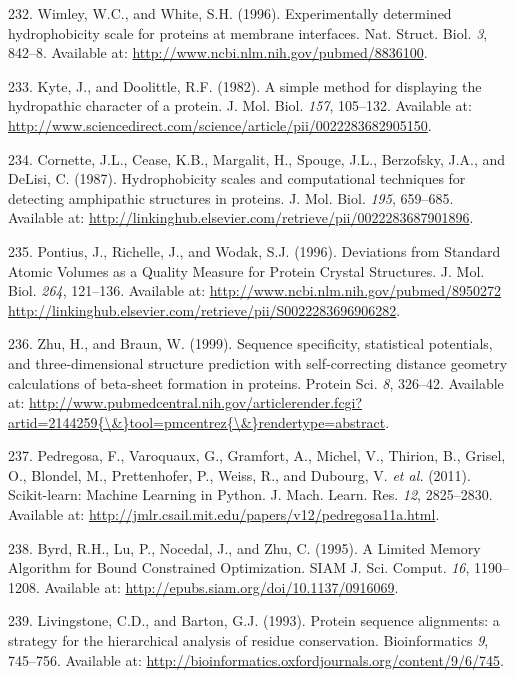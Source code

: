 \documentclass[11pt,a4paper,twoside]{book}
\theoremstyle{definition}
\theoremstyle{definition}
\theoremstyle{remark}
\begin{document}
\hypertarget{ref-Wimley1996}{}
232. Wimley, W.C., and White, S.H. (1996). Experimentally determined
hydrophobicity scale for proteins at membrane interfaces. Nat. Struct.
Biol. \emph{3}, 842--8. Available at:
\url{http://www.ncbi.nlm.nih.gov/pubmed/8836100}.

\hypertarget{ref-Kyte1982}{}
233. Kyte, J., and Doolittle, R.F. (1982). A simple method for
displaying the hydropathic character of a protein. J. Mol. Biol.
\emph{157}, 105--132. Available at:
\url{http://www.sciencedirect.com/science/article/pii/0022283682905150}.

\hypertarget{ref-Cornette1987}{}
234. Cornette, J.L., Cease, K.B., Margalit, H., Spouge, J.L., Berzofsky,
J.A., and DeLisi, C. (1987). Hydrophobicity scales and computational
techniques for detecting amphipathic structures in proteins. J. Mol.
Biol. \emph{195}, 659--685. Available at:
\url{http://linkinghub.elsevier.com/retrieve/pii/0022283687901896}.

\hypertarget{ref-Pontius1996}{}
235. Pontius, J., Richelle, J., and Wodak, S.J. (1996). Deviations from
Standard Atomic Volumes as a Quality Measure for Protein Crystal
Structures. J. Mol. Biol. \emph{264}, 121--136. Available at:
\href{http://www.ncbi.nlm.nih.gov/pubmed/8950272\%20http://linkinghub.elsevier.com/retrieve/pii/S0022283696906282}{http://www.ncbi.nlm.nih.gov/pubmed/8950272 http://linkinghub.elsevier.com/retrieve/pii/S0022283696906282}.

\hypertarget{ref-Zhu1999}{}
236. Zhu, H., and Braun, W. (1999). Sequence specificity, statistical
potentials, and three-dimensional structure prediction with
self-correcting distance geometry calculations of beta-sheet formation
in proteins. Protein Sci. \emph{8}, 326--42. Available at:
\href{http://www.pubmedcentral.nih.gov/articlerender.fcgi?artid=2144259\%7B/\&\%7Dtool=pmcentrez\%7B/\&\%7Drendertype=abstract}{http://www.pubmedcentral.nih.gov/articlerender.fcgi?artid=2144259\{\textbackslash{}\&\}tool=pmcentrez\{\textbackslash{}\&\}rendertype=abstract}.

\hypertarget{ref-Pedregosa2011}{}
237. Pedregosa, F., Varoquaux, G., Gramfort, A., Michel, V., Thirion,
B., Grisel, O., Blondel, M., Prettenhofer, P., Weiss, R., and Dubourg,
V. \emph{et al.} (2011). Scikit-learn: Machine Learning in Python. J.
Mach. Learn. Res. \emph{12}, 2825--2830. Available at:
\url{http://jmlr.csail.mit.edu/papers/v12/pedregosa11a.html}.

\hypertarget{ref-Byrd1995}{}
238. Byrd, R.H., Lu, P., Nocedal, J., and Zhu, C. (1995). A Limited
Memory Algorithm for Bound Constrained Optimization. SIAM J. Sci.
Comput. \emph{16}, 1190--1208. Available at:
\url{http://epubs.siam.org/doi/10.1137/0916069}.

\hypertarget{ref-Livingstone1993}{}
239. Livingstone, C.D., and Barton, G.J. (1993). Protein sequence
alignments: a strategy for the hierarchical analysis of residue
conservation. Bioinformatics \emph{9}, 745--756. Available at:
\url{http://bioinformatics.oxfordjournals.org/content/9/6/745}.
\end{document}

